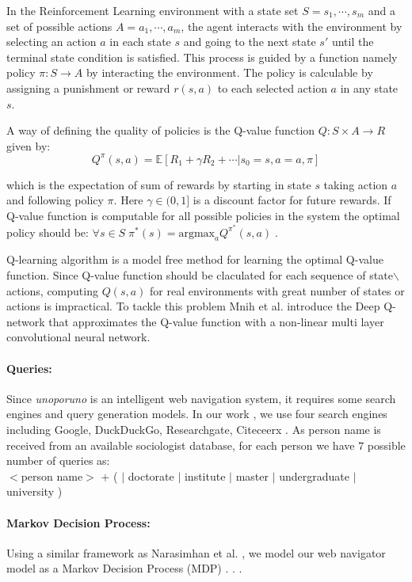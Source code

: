 In the Reinforcement Learning environment with a state set $S = s_1, \cdots, s_m$ and a  set of possible actions $A = a_1, \cdots, a_m$, the agent interacts with the environment by selecting an action $a$ in each state $s$ and going to the next state $s'$ until the terminal state condition is satisfied. This process is guided by a function namely policy $\pi : S \longrightarrow A$ by interacting the environment. The policy is calculable by assigning a punishment or reward $r(s, a)$ to each selected action $a$ in any state $s$.  

A way of defining the quality of policies is the Q-value function $Q : S \times A \longrightarrow R$ given by: 
$$Q^{\pi}(s, a) = \mathbb{E}[R_1+ \gamma R_2 + \cdots | s_0 = s, a =a, \pi]$$

which is the expectation of sum of rewards by starting in state $s$ taking action $a$ and following policy $\pi$. Here $\gamma \in (0, 1]$ is a discount factor for future rewards. If Q-value function is computable for all possible policies in the system the optimal policy should be: $\forall  s \in S \; \pi^*(s) = \text{argmax}_a Q^{\pi^*}(s, a) \; $.  

Q-learning algorithm \cite{puterman1994} is a model free method for learning the optimal Q-value function. Since Q-value function should be claculated for each sequence of state$\backslash$actions, computing $Q(s, a)$ for real environments with great number of states or actions  is impractical.  To tackle this problem Mnih et al. \cite{mnih2015} introduce the Deep Q-network that approximates the Q-value function with a non-linear multi layer convolutional neural network. 

\paragraph{Queries: }  Since \textit{unoporuno} is an intelligent web navigation system, it requires some search engines and query generation models. In our work , we use four search engines including Google, DuckDuckGo, Researchgate, Citeceerx  . As person name is received from an available sociologist database, for each person we have $7$ possible number of queries as: \\

$<$person name$>$ $+$ (  $|$ doctorate $|$ institute $|$ master $|$ undergraduate $|$ university ) 

\paragraph{Markov Decision Process: } Using a similar framework as Narasimhan et al. , we model our web navigator model as a Markov Decision Process (MDP) \cite{puterman1994}. . .

